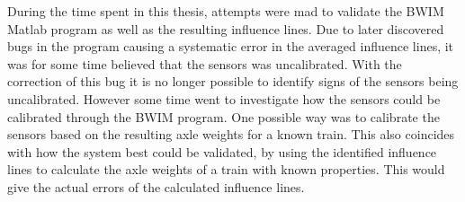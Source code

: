 During the time spent in this thesis, attempts were mad to validate the BWIM Matlab program as well as the resulting influence lines. Due to later discovered bugs in the program causing a systematic error in the averaged influence lines, it was for some time believed that the sensors was uncalibrated. With the correction of this bug it is no longer possible to identify signs of the sensors being uncalibrated. However some time went to investigate how the sensors could be calibrated through the BWIM program. One possible way was to calibrate the sensors based on the resulting axle weights for a known train. This also coincides with how the system best could be validated, by using the identified influence lines to calculate the axle weights of a train with known properties. This would give the actual errors of the calculated influence lines.
